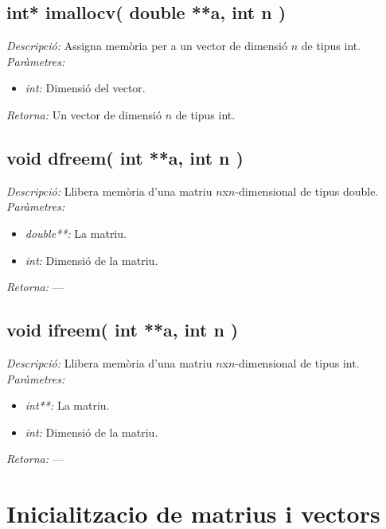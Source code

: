 \documentclass[a4paper,10pt, notitlepage]{article}
\begin{document}
\subsection{int* imallocv( double **a, int n )}
\textit{Descripció: }
  Assigna memòria per a un vector de dimensió $n$ de tipus int.
\\\textit{Paràmetres: }\begin{itemize}[label={--}]
  \item \textit{int: } Dimensió del vector.
\end{itemize}
\textit{Retorna: } Un vector de dimensió $n$ de tipus int.



\subsection{void dfreem( int **a, int n )}
\textit{Descripció: }
  Llibera memòria d'una matriu $n$x$n$-dimensional de tipus double.
\\\textit{Paràmetres: }\begin{itemize}[label={--}]
  \item \textit{double**: } La matriu.
  \item \textit{int: } Dimensió de la matriu.
\end{itemize}
\textit{Retorna: } ---



\subsection{void ifreem( int **a, int n )}
\textit{Descripció: }
  Llibera memòria d'una matriu $n$x$n$-dimensional de tipus int.
\\\textit{Paràmetres: }\begin{itemize}[label={--}]
  \item \textit{int**: } La matriu.
  \item \textit{int: } Dimensió de la matriu.
\end{itemize}
\textit{Retorna: } ---



\section{Inicialitzacio de matrius i vectors}
\end{document}
